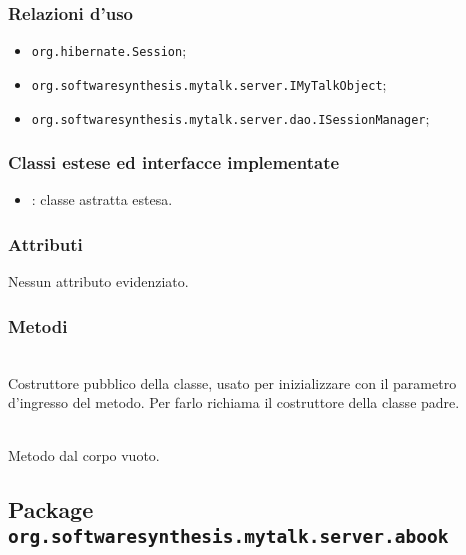 \subsubsection*{Relazioni d'uso}

\begin{itemize}
		\item \texttt{org.hibernate.Session};
		\item \texttt{org.softwaresynthesis.mytalk.server.IMyTalkObject};
		\item \texttt{org.softwaresynthesis.mytalk.server.dao.ISessionManager};
\end{itemize}

\subsubsection*{Classi estese ed interfacce implementate}

\begin{itemize}
	\item {}: classe astratta estesa.
\end{itemize}

\subsubsection*{Attributi}

Nessun attributo evidenziato.

\subsubsection*{Metodi}

\begin{description}
	\item{}\\
	Costruttore pubblico della classe, usato per inizializzare  con il parametro d'ingresso del metodo. Per farlo richiama il costruttore della classe padre.

	\item{}\\
	Metodo dal corpo vuoto.

\end{description}

\subsection{Package \texttt{org.softwaresynthesis.mytalk.server.abook}}\label{sec:abook}

